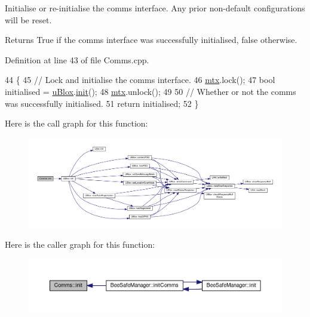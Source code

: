 Initialise or re-\/initialise the comms interface. Any prior non-\/default configurations will be reset.

\begin{DoxyReturn}{Returns}
True if the comms interface was successfully initialised, false otherwise. 
\end{DoxyReturn}


Definition at line 43 of file Comms.\+cpp.


\begin{DoxyCode}
44 \{
45     \textcolor{comment}{// Lock and initialise the comms interface.}
46     \hyperlink{class_comms_a21df861b1202573e4cd0cb5666d638fe}{mtx}.lock();
47     \textcolor{keywordtype}{bool} initialised = \hyperlink{class_comms_ac64dea134b116147e5441172346dbd6c}{uBlox}.\hyperlink{class_u_blox_a34c2f507ff3bbd21b9aea788a015527a}{init}();
48     \hyperlink{class_comms_a21df861b1202573e4cd0cb5666d638fe}{mtx}.unlock();
49 
50     \textcolor{comment}{// Whether or not the comms was successfully initialised.}
51     \textcolor{keywordflow}{return} initialised;
52 \}
\end{DoxyCode}
Here is the call graph for this function\+:
\nopagebreak
\begin{figure}[H]
\begin{center}
\leavevmode
\includegraphics[width=350pt]{d8/dcc/class_comms_aa0519d3ed2d5bd6aad60101080ac2de7_cgraph}
\end{center}
\end{figure}
Here is the caller graph for this function\+:
\nopagebreak
\begin{figure}[H]
\begin{center}
\leavevmode
\includegraphics[width=350pt]{d8/dcc/class_comms_aa0519d3ed2d5bd6aad60101080ac2de7_icgraph}
\end{center}
\end{figure}
\mbox{\label{class_comms_a30ab10ea604ab2b169ca66f3f1071c0e}} 
